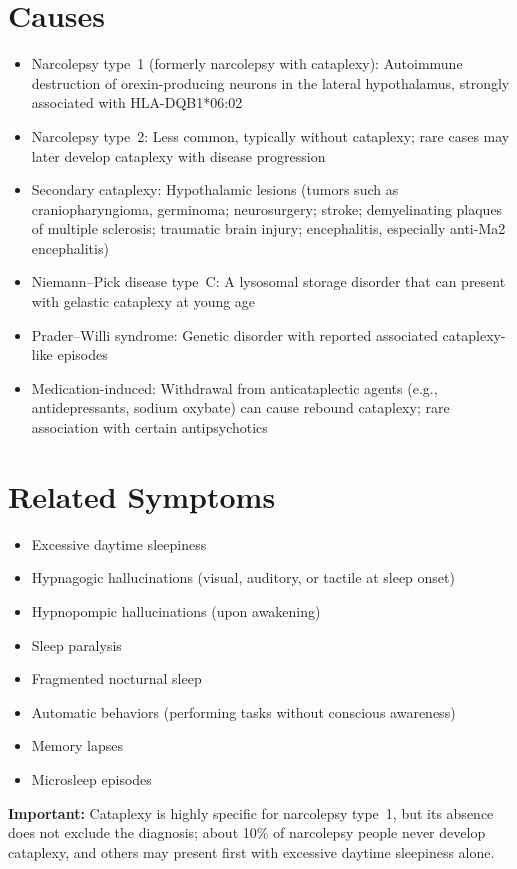 \section*{Causes}
\begin{itemize}
 \item Narcolepsy type~1 (formerly narcolepsy with cataplexy): Autoimmune destruction of orexin-producing neurons in the lateral hypothalamus, strongly associated with HLA-DQB1*06:02
 \item Narcolepsy type~2: Less common, typically without cataplexy; rare cases may later develop cataplexy with disease progression
 \item Secondary cataplexy: Hypothalamic lesions (tumors such as craniopharyngioma, germinoma; neurosurgery; stroke; demyelinating plaques of multiple sclerosis; traumatic brain injury; encephalitis, especially anti-Ma2 encephalitis)
 \item Niemann–Pick disease type~C: A lysosomal storage disorder that can present with gelastic cataplexy at young age
 \item Prader–Willi syndrome: Genetic disorder with reported associated cataplexy-like episodes
 \item Medication-induced: Withdrawal from anticataplectic agents (e.g., antidepressants, sodium oxybate) can cause rebound cataplexy; rare association with certain antipsychotics
\end{itemize}

\section*{Related Symptoms}
\begin{itemize}
 \item Excessive daytime sleepiness
 \item Hypnagogic hallucinations (visual, auditory, or tactile at sleep onset)
 \item Hypnopompic hallucinations (upon awakening)
 \item Sleep paralysis
 \item Fragmented nocturnal sleep
 \item Automatic behaviors (performing tasks without conscious awareness)
 \item Memory lapses
 \item Microsleep episodes
\end{itemize}
\textbf{Important:} Cataplexy is highly specific for narcolepsy type~1, but its absence does not exclude the diagnosis; about 10\% of narcolepsy people never develop cataplexy, and others may present first with excessive daytime sleepiness alone.

